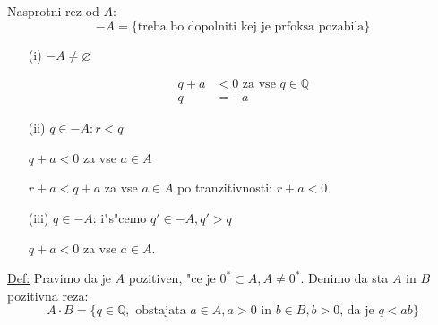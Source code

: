 Nasprotni rez od \(A\):
\[-A = \{\text{treba bo dopolniti kej je prfoksa pozabila}\}\]
\begin{enumerate}
	\item[(i)] \(-A \neq \varnothing\)
	
	\begin{align*}
		q + a &< 0 \text{ za vse } q \in \mathbb{Q}\\
		q &= -a
	\end{align*}
	
	\item[(ii)] \(q \in -A: r < q\)
	
	\(q + a < 0\) za vse \(a \in A\)
	
	\(r + a < q + a\) za vse \(a \in A\) po tranzitivnosti: \(r + a < 0\)
	
	\item[(iii)] \(q \in -A\): i"s"cemo \(q' \in -A, q' > q\)
	
	\(q + a < 0\) za vse \(a \in A\).
\end{enumerate}

\underline{Def:} Pravimo da je \(A\) pozitiven, "ce je \(0^* \subset A, A \neq 0^*\). Denimo da sta \(A\) in \(B\) pozitivna reza:
\[A \cdot B = \{q \in \mathbb{Q}, \text{ obstajata } a \in A, a > 0 \text{ in } b \in B, b > 0 \text{, da je } q < ab\}\]
